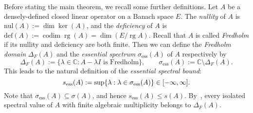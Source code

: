 \documentclass[sn-mathphys]{sn-jnl}%
\theoremstyle{thmstyleone}
\theoremstyle{thmstylethree}
\DeclareMathOperator{\rg}{rg}
\DeclareMathOperator{\codim}{codim}
\let\Re\relax
\DeclareMathOperator{\Re}{Re}
\newcommand{\CC}{\mathbb{C}}
\begin{document}
Before stating the main theorem, we recall some further definitions. Let $A$ be a densely-defined closed linear operator on a Banach space $E$. The \emph{nullity} of $A$ is $\mathrm{nul}(A):=\dim\ker(A)$, and the \emph{deficiency} of $A$ is $\mathrm{def}(A):=\codim\rg(A)=\dim(E/\rg A)$. Recall that $A$ is called \emph{Fredholm} if its nullity and deficiency are both finite. Then we can define the \emph{Fredholm domain} $\Delta_F(A)$ and the \emph{essential spectrum} $\sigma_{\mathrm{ess}}(A)$ of $A$ respectively by
\begin{equation}
	\Delta_F(A):=\{\lambda\in\CC: A-\lambda I \text{ is Fredholm}\}, \qquad \sigma_{\mathrm{ess}}(A):= \CC\setminus\Delta_F(A).
\end{equation}
This leads to the natural definition of the \emph{essential spectral bound}:
\begin{equation}
	s_{\mathrm{ess}}(A):=\sup\{\Re\lambda:\lambda\in\sigma_{\mathrm{ess}}(A)\} \in [-\infty,\infty].
\end{equation}
Note that $\sigma_{\mathrm{ess}}(A)\subseteq\sigma(A)$, and hence $s_{\mathrm{ess}}(A)\le s(A)$. By~\cite[Theorem IV.5.28]{Kato}, every isolated spectral value of $A$ with finite algebraic multiplicity belongs to $\Delta_F(A)$.
\end{document}
